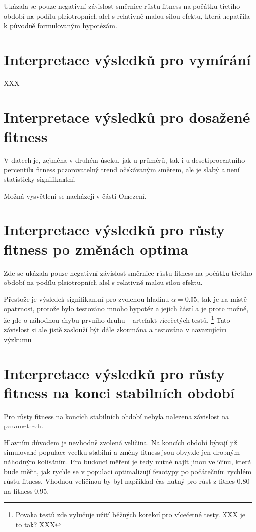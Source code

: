 Ukázala se pouze negativní závislost směrnice růstu fitness na počátku třetího období na podílu pleiotropních alel s
relativně malou silou efektu, která nepatřila k původně formulovaným hypotézám.

\section{Interpretace výsledků pro vymírání}

XXX

\section{Interpretace výsledků pro dosažené fitness}

V datech je, zejména v druhém úseku, jak u průměrů, tak i u desetiprocentního percentilu fitness pozorovatelný trend
očekávaným směrem, ale je slabý a není statisticky signifikantní.

Možná vysvětlení se nacházejí v části Omezení.

\section{Interpretace výsledků pro růsty fitness po změnách optima}

Zde se ukázala pouze negativní závislost směrnice růstu fitness na počátku třetího období na podílu pleiotropních alel
s relativně malou silou efektu.

Přestože je výsledek signifikantní pro zvolenou hladinu $\alpha = 0.05$, tak je na místě
opatrnost, protože bylo testováno mnoho hypotéz a jejich částí a je proto možné, že jde o náhodnou chybu prvního
druhu -- artefakt vícečetých testů. \footnote{Povaha testů zde vylučuje užití běžných korekcí pro vícečetné
testy. XXX je to tak? XXX}
Tato závislost si ale jistě zaslouží být dále zkoumána a testována v navazujícím výzkumu.

\section{Interpretace výsledků pro růsty fitness na konci stabilních období}

Pro růsty fitness na koncích stabilních období nebyla nalezena závislost na parametrech.

Hlavním důvodem je nevhodně zvolená veličina. Na koncích období bývají již simulované populace vcelku stabilní a
změny fitness jsou obvykle jen drobným náhodným kolísáním. Pro budoucí měření je tedy nutné najít jinou veličinu,
která bude měřit, jak rychle se v populaci optimalizují fenotypy po počátečním rychlém růstu fitness. Vhodnou veličinou
by byl například čas nutný pro růst z fitnes 0.80 na fitness 0.95.

